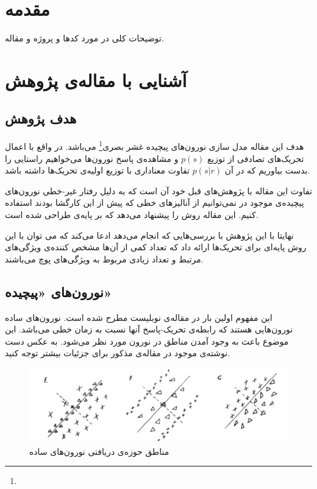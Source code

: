 \documentclass[12pt,onecolumn,a4paper,fleqn]{article}
\begin{document}
	\neurotitlepage

\section{مقدمه}

توضیحات کلی در مورد کدها و پروژه و مقاله.

\pagebreak

\section{آشنایی با مقاله‌ی پژوهش}

\subsection{هدف پژوهش}
هدف این مقاله مدل سازی  نورون‌های پیچیده‌ غشر بصری\footnote{} می‌باشد. در واقع با اعمال تحریک‌های تصادفی  از توزیع 
$p(s)$
و مشاهده‌ی پاسخ نورون‌ها می‌خواهیم راستایی را بدست بیاوریم که در آن $p(s|r)$ تفاوت معناداری با توزیع اولیه‌ی تحریک‌ها داشته باشد.

تفاوت این مقاله با پژوهش‌های قبل خود آن است که به دلیل رفتار غیر-خطی نورون‌های پیچیده‌ی موجود در   نمی‌توانیم از آنالیز‌های خطی 
که پیش از این کارگشا بودند استفاده کنیم. این مقاله روش 
 را پیشنهاد می‌دهد که بر پایه‌ی  طراحی شده است.

نهایتا با این پژوهش با بررسی‌هایی که انجام می‌دهد ادعا می‌کند که می توان  با این روش پایه‌ای برای تحریک‌ها ارائه داد که تعداد کمی از آن‌ها مشخص کننده‌ی ویژگی‌های مرتبط و تعداد زیادی مربوط به ویژگی‌های پوچ می‌باشند.
\subsection{نورون‌های‌ «پیچیده»}
این مفهوم اولین بار در مقاله‌ی نوبلیست  مطرح شده است. نورون‌های ساده نورون‌هایی هستند که رابطه‌ی تحریک-پاسخ آنها نسبت به زمان خطی می‌باشد. این موضوع باعث به وجود آمدن مناطق  در  نورون مورد نظر می‌شود. به عکس دست نوشته‌ی موجود در مقاله‌ی مذکور برای جزئیات بیشتر توجه کنید.

\begin{figure}[h]
	\centering
	\includegraphics[width=0.8\linewidth]{photos/simple_cells.png}
  \caption[]{مناطق  حوزه‌ی دریافتی نورون‌های ساده\footnotemark}
\end{figure}
\end{document}
